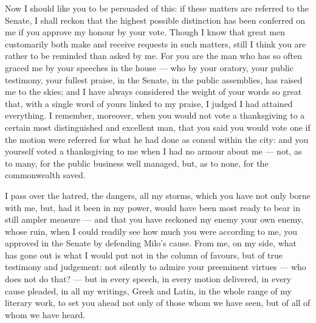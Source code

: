  Now I should like you to be persuaded of this: if these matters are referred to the Senate, I shall reckon that the highest possible distinction has been conferred on me if you approve my honour by your vote. Though I know that great men customarily both make and receive requests in such matters, still I think you are rather to be reminded than asked by me. For you are the man who has so often graced me by your speeches in the house --- who by your oratory, your public testimony, your fullest praise, in the Senate, in the public assemblies, has raised me to the skies; and I have always considered the weight of your words so great that, with a single word of yours linked to my praise, I judged I had attained everything. I remember, moreover, when you would not vote a thanksgiving to a certain most distinguished and excellent man, that you said you would vote one if the motion were referred for what he had done as consul within the city: and you yourself voted a thanksgiving to me when I had no armour about me --- not, as to many, for the public business well managed, but, as to none, for the commonwealth saved.

 I pass over the hatred, the dangers, all my storms, which you have not only borne with me, but, had it been in my power, would have been most ready to bear in still ampler measure --- and that you have reckoned my enemy your own enemy, whose ruin, when I could readily see how much you were according to me, you approved in the Senate by defending Milo's cause. From me, on my side, what has gone out is what I would put not in the column of favours, but of true testimony and judgement: not silently to admire your preeminent virtues --- who does not do that? --- but in every speech, in every motion delivered, in every cause pleaded, in all my writings, Greek and Latin, in the whole range of my literary work, to set you ahead not only of those whom we have seen, but of all of whom we have heard.

